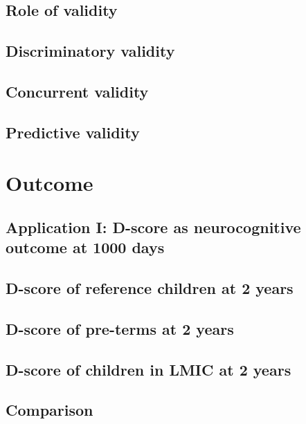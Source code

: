\documentclass[]{book}
\begin{document}
\section{Role of validity}\label{role-of-validity}

\section{Discriminatory validity}\label{discriminatory-validity}

\section{Concurrent validity}\label{concurrent-validity}

\section{Predictive validity}\label{predictive-validity}

\chapter{Outcome}\label{outcome}

\section{Application I: D-score as neurocognitive outcome at 1000
days}\label{application-i-d-score-as-neurocognitive-outcome-at-1000-days}

\section{D-score of reference children at 2
years}\label{d-score-of-reference-children-at-2-years}

\section{D-score of pre-terms at 2
years}\label{d-score-of-pre-terms-at-2-years}

\section{D-score of children in LMIC at 2
years}\label{d-score-of-children-in-lmic-at-2-years}

\section{Comparison}\label{comparison}
\end{document}
